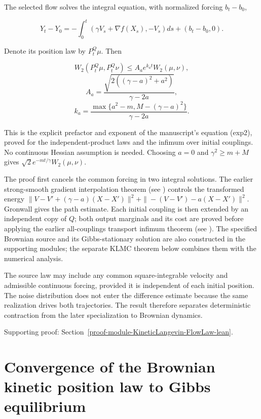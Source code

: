 \documentclass[11pt,a4paper]{report}
\begin{document}
The selected flow solves the integral equation, with normalized
forcing \(b_t-b_0\),


\[Y_t-Y_0=-\int_0^t(\gamma V_s+\nabla f(X_s),-V_s)ds+(b_t-b_0,0).\]


Denote its position law by \(P_t^Q\mu\). Then


\[\boxed{W_2(P_t^Q\mu,P_t^Q\nu)\le A_a e^{k_at}W_2(\mu,\nu),}\]
\[A_a=\frac{\sqrt{2((\gamma-a)^2+a^2)}}{\gamma-2a},\]
\[k_a=\frac{\max\{a^2-m,M-(\gamma-a)^2\}}{\gamma-2a}.\]


This is the explicit prefactor and exponent of the manuscript's equation
(exp2), proved for the independent-product laws and the infimum over
initial couplings. No continuous Hessian assumption is needed. Choosing
\(a=0\) and \(\gamma^2\ge m+M\) gives
\(\sqrt2e^{-mt/\gamma}W_2(\mu,\nu)\).




The proof first cancels the common forcing in two integral solutions.
The earlier strong-smooth gradient interpolation theorem (see \cite[Section~3.10.2]{LangevinLean2026ULASC}) controls the transformed energy
\(\|V-V'+(\gamma-a)(X-X')\|^2+\|-(V-V')-a(X-X')\|^2\).
Gronwall gives the path estimate. Each initial coupling is then extended by
an independent copy of \(Q\); both output marginals and its cost are proved
before applying the earlier all-couplings transport infimum theorem (see \cite[Section~3.18.4]{LangevinLean2026ULASC}). The specified Brownian source and
its Gibbs-stationary solution are also constructed in the supporting modules;
the separate KLMC theorem below combines them with the numerical analysis.



The source law may include any common square-integrable velocity and admissible continuous forcing, provided it is independent of each initial position. The noise distribution does not enter the difference estimate because the same realization drives both trajectories. The result therefore separates deterministic contraction from the later specialization to Brownian dynamics.


{\small\color{gray}Supporting proof: Section~\ref{proof-module-KineticLangevin-FlowLaw-lean}.\par}
\section{\texorpdfstring{Convergence of the Brownian kinetic position law to Gibbs equilibrium}{Convergence of the Brownian kinetic position law to Gibbs equilibrium}}
\end{document}
